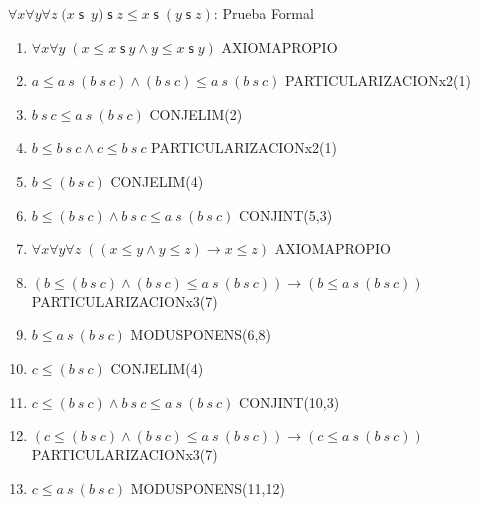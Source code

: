 \documentclass[10pt]{beamer}
\newcounter{saveenumi}
\newcommand{\seti}{\setcounter{saveenumi}{\value{enumi}}}
\newcommand{\Cfonta}{\fontsize{6.7}{9.5}\selectfont}
\newcommand{\Nand}{\wedge}
\newcommand{\trans}{\forall x\forall y\forall z\;\left( (x\leq y\wedge
y\leq z)\rightarrow x\leq z\right)}
\newcommand{\sCot}{\forall x\forall y\;(x\leq x\;\mathsf{s}\ y\wedge y\leq x\;\mathsf{s}\;y)}
\newcommand{\assoc}{\forall x\forall y\forall
z\;(x\;\mathsf{s}$\ $y)\;\mathsf{s}\;z\leq x\;\mathsf{s}\;(y\;\mathsf{s}\;z)}
\begin{document}
\begin{frame}{$\assoc$: Prueba Formal}
\Cfonta
  \begin{enumerate}[<+->]
    \item $ \sCot $ \hfill AXIOMAPROPIO
    \item $ a \leq a\ s\ (b\ s\ c)\Nand (b\ s\ c)\leq a\ s\ (b\ s\ c) $ \hfill PARTICULARIZACIONx2(1)
    \item $ b\ s\ c \leq a\ s\ (b\ s\ c)$ \hfill CONJELIM(2)
    \item $ b \leq b\ s\ c \Nand c \leq b\ s\ c $ \hfill PARTICULARIZACIONx2(1)
    \item $ b \leq (b\ s\ c)$ \hfill CONJELIM(4)
    \item $ b \leq (b\ s\ c) \Nand b\ s\ c \leq a\ s\ (b\ s\ c)$ \hfill CONJINT(5,3)
    \item $ \trans $ \hfill AXIOMAPROPIO
    \item $ (b \leq (b\ s\ c) \Nand (b\ s\ c) \leq a\ s\ (b\ s\ c)) \rightarrow (b \leq a\ s\ (b\ s\ c))$ \hfill PARTICULARIZACIONx3(7)
    \item $ b \leq a\ s\ (b\ s\ c) $ \hfill MODUSPONENS(6,8)
    \item $ c \leq (b\ s\ c)$ \hfill CONJELIM(4)
    \item $ c \leq (b\ s\ c) \Nand  b\ s\ c \leq a\ s\ (b\ s\ c) $ \hfill CONJINT(10,3)
    \item $ (c \leq (b\ s\ c) \Nand (b\ s\ c) \leq a\ s\ (b\ s\ c)) \rightarrow (c \leq a\ s\ (b\ s\ c))$ \hfill PARTICULARIZACIONx3(7)
    \item $ c \leq a\ s\ (b\ s\ c) $ \hfill MODUSPONENS(11,12)
    \seti
  \end{enumerate}


  \setcounter{equation}{0}

\end{frame}
\end{document}
